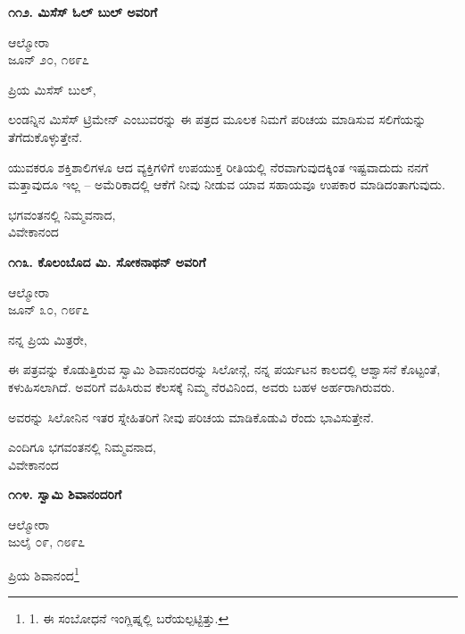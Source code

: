 \begin{center}
\textbf{೧೧೨. ಮಿಸೆಸ್ ಓಲ್ ಬುಲ್ ಅವರಿಗೆ}
\end{center}

\begin{flushright}
ಆಲ್ಮೋರಾ\\ಜೂನ್ ೨೦, ೧೮೯೭
\end{flushright}

ಪ್ರಿಯ ಮಿಸೆಸ್ ಬುಲ್,

ಲಂಡನ್ನಿನ ಮಿಸೆಸ್ ಟ್ರಿಮೇನ್ ಎಂಬುವರನ್ನು ಈ ಪತ್ರದ ಮೂಲಕ ನಿಮಗೆ ಪರಿಚಯ ಮಾಡಿಸುವ ಸಲಿಗೆಯನ್ನು ತೆಗೆದುಕೊಳ್ಳುತ್ತೇನೆ.

ಯುವಕರೂ ಶಕ್ತಿಶಾಲಿಗಳೂ ಆದ ವ್ಯಕ್ತಿಗಳಿಗೆ ಉಪಯುಕ್ತ ರೀತಿಯಲ್ಲಿ ನೆರವಾಗುವುದಕ್ಕಿಂತ ಇಷ್ಟವಾದುದು ನನಗೆ ಮತ್ತಾವುದೂ ಇಲ್ಲ – ಅಮೆರಿಕಾದಲ್ಲಿ ಆಕೆಗೆ ನೀವು ನೀಡುವ ಯಾವ ಸಹಾಯವೂ ಉಪಕಾರ ಮಾಡಿದಂತಾಗುವುದು.

\begin{flushright}
ಭಗವಂತನಲ್ಲಿ ನಿಮ್ಮವನಾದ,\\ವಿವೇಕಾನಂದ
\end{flushright}

\begin{center}
\textbf{೧೧೩. ಕೊಲಂಬೊದ ಮಿ. ಸೋಕನಾಥನ್ ಅವರಿಗೆ}
\end{center}

\begin{flushright}
ಆಲ್ಮೋರಾ\\ಜೂನ್ ೩೦, ೧೮೯೭
\end{flushright}

ನನ್ನ ಪ್ರಿಯ ಮಿತ್ರರೇ,

ಈ ಪತ್ರವನ್ನು ಕೊಡುತ್ತಿರುವ ಸ್ವಾಮಿ ಶಿವಾನಂದರನ್ನು ಸಿಲೋನ್ಗೆ, ನನ್ನ ಪರ್ಯಟನ ಕಾಲದಲ್ಲಿ ಆಶ್ವಾಸನೆ ಕೊಟ್ಟಂತೆ, ಕಳುಹಿಸಲಾಗಿದೆ. ಅವರಿಗೆ ವಹಿಸಿರುವ ಕೆಲಸಕ್ಕೆ ನಿಮ್ಮ ನೆರವಿನಿಂದ, ಅವರು ಬಹಳ ಅರ್ಹರಾಗಿರುವರು.

ಅವರನ್ನು ಸಿಲೋನಿನ ಇತರ ಸ್ನೇಹಿತರಿಗೆ ನೀವು ಪರಿಚಯ ಮಾಡಿಕೊಡುವಿ ರೆಂದು ಭಾವಿಸುತ್ತೇನೆ.

\begin{flushright}
ಎಂದಿಗೂ ಭಗವಂತನಲ್ಲಿ ನಿಮ್ಮವನಾದ,\\ವಿವೇಕಾನಂದ
\end{flushright}

\begin{center}
\textbf{೧೧೪. ಸ್ವಾಮಿ ಶಿವಾನಂದರಿಗೆ}
\end{center}

\begin{flushright}
ಆಲ್ಮೋರಾ\\ಜುಲೈ ೦೯, ೧೮೯೭
\end{flushright}

ಪ್ರಿಯ ಶಿವಾನಂದ\footnote{1. ಈ ಸಂಬೋಧನೆ ಇಂಗ್ಲಿಷ್ನಲ್ಲಿ ಬರೆಯಲ್ಪಟ್ಟಿತ್ತು.}

